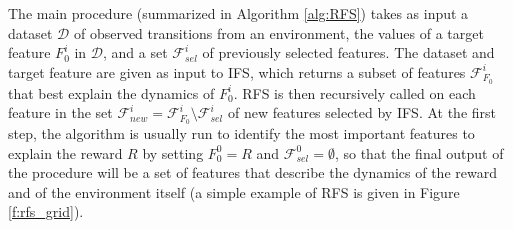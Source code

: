 The main procedure (summarized in Algorithm \ref{alg:RFS}) takes as input a 
dataset $\mathcal{D}$ of observed transitions from an environment, the values 
of a target feature $F_0^i$ in $\mathcal{D}$, and a set $\mathcal{F}_{sel}^i$ of
previously selected features. 
The dataset and target feature are given as input to IFS, which returns a subset
of features $\mathcal{F}_{F_0}^i$ that best explain the dynamics of $F_0^i$. 
RFS is then recursively called on each feature in the set 
$\mathcal{F}_{new}^i = \mathcal{F}_{F_0}^i \setminus \mathcal{F}_{sel}^i$ of new
features selected by IFS.
At the first step, the algorithm is usually run to identify the most important 
features to explain the reward $R$ by setting $F_0^0 = R$ and 
$\mathcal{F}_{sel}^0 = \emptyset$, so that the final output of the procedure 
will be a set of features that describe the dynamics of the reward and of the 
environment itself (a simple example of RFS is given in Figure \ref{f:rfs_grid}).
%
